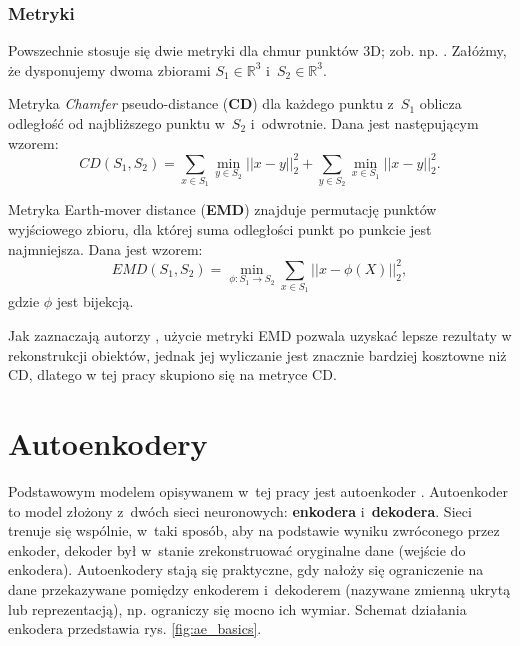 \documentclass{iithesis}
\begin{document}
\subsubsection{Metryki}
Powszechnie stosuje się dwie metryki dla chmur punktów 3D; zob. np. \cite{metrics}.
Załóżmy, że dysponujemy dwoma zbiorami $S_1 \in \mathbb{R}^3$ i~$S_2 \in \mathbb{R}^3$.

Metryka \textit{Chamfer} pseudo-distance (\textbf{CD}) dla każdego punktu z~$S_1$ oblicza
odległość od najbliższego punktu w~$S_2$ i~odwrotnie. Dana jest następującym wzorem:
\begin{equation} \label{eq:chamfer_intro}
CD(S_1, S_2) = \sum_{x \in S_1} \min_{y \in S_2} ||x-y||_2^2 + \sum_{y \in S_2} \min_{x \in S_1} ||x-y||_2^2.
\end{equation}

Metryka Earth-mover distance (\textbf{EMD}) \cite{emd} znajduje permutację punktów wyjściowego zbioru,
dla której suma odległości punkt po punkcie jest najmniejsza. Dana jest wzorem:
\begin{equation}
EMD(S_1, S_2) = \min_{\phi:S_1 \rightarrow S_2} \sum_{x \in S_1} ||x-\phi(X)||_2^2,
\end{equation}
gdzie $\phi$ jest bijekcją.

Jak zaznaczają autorzy \cite{pc_representations}, użycie metryki EMD pozwala uzyskać lepsze rezultaty
w rekonstrukcji obiektów, jednak jej wyliczanie jest znacznie bardziej kosztowne niż CD, dlatego
w tej pracy skupiono się na metryce CD.

\section{Autoenkodery}
Podstawowym modelem opisywanem w~tej pracy jest autoenkoder \cite{autoencoders}. Autoenkoder to model
złożony z~dwóch sieci neuronowych: \textbf{enkodera} i~\textbf{dekodera}. Sieci trenuje
się wspólnie, w~taki sposób, aby na podstawie wyniku zwróconego przez enkoder, dekoder był w~stanie
zrekonstruować oryginalne dane (wejście do enkodera). Autoenkodery stają się praktyczne, gdy
nałoży się ograniczenie na dane przekazywane pomiędzy enkoderem i~dekoderem
(nazywane zmienną ukrytą lub reprezentacją),
np. ograniczy się mocno ich wymiar. Schemat działania enkodera przedstawia rys. \ref{fig:ae_basics}.
\end{document}
